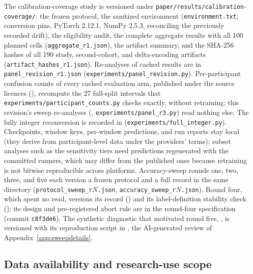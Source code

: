 \documentclass[10pt,twocolumn]{article}
\begin{document}
The calibration-coverage study is versioned under
\texttt{paper/results/calibration-coverage/}: the frozen protocol, the
sanitized environment (\texttt{environment.txt}; conversion pins,
PyTorch 2.12.1, NumPy 2.5.3, reconciling the previously recorded
drift), the eligibility audit, the complete aggregate results with all
100 planned cells (\texttt{aggregate\_r1.json}), the artifact summary,
and the SHA-256 hashes of all 190 study, second-cohort, and delta-encoding
artifacts (\texttt{artifact\_hashes\_r1.json}). Re-analyses of cached
results are in \texttt{panel\_revision\_r1.json}
(\texttt{experiments/panel\_revision.py}). Per-participant confusion
counts of every cached evaluation arm, published under the source
licences (), recompute the 27
full-split intervals that \texttt{experiments/participant\_counts.py}
checks exactly, without retraining; this revision's sweep re-analyses
(, \texttt{experiments/panel\_r3.py}) read nothing
else. The fully integer reconversion is recorded in
 (\texttt{experiments/full\_integer.py}). Checkpoints, window keys, per-window
predictions, and run reports stay local (they derive from
participant-level data under the providers' terms); subset analyses such
as the sensitivity tiers need predictions regenerated with the committed
runners, which may differ from the published ones because retraining is
not bitwise reproducible across platforms.
Accuracy-sweep rounds one, two, three, and five each version a frozen protocol and a full record
in the same directory (\texttt{protocol\_sweep\_r$N$.json},
\texttt{accuracy\_sweep\_r$N$.json}). Round four, which spent no read,
versions its record () and its
label-definition stability check (); its design
and pre-registered abort rule are in the round-four specification (commit
\texttt{c8f3de6}). The synthetic diagnostic that motivated round five,
, is versioned with its reproduction script in
, the AI-generated review
of Appendix~\ref{app:sweepdetails}.

\subsection{Data availability and research-use scope}
\end{document}
